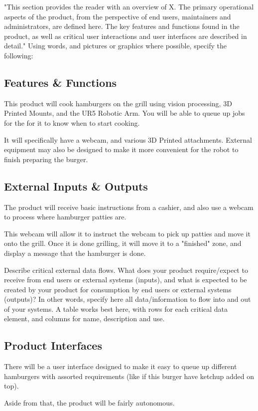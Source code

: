 "This section provides the reader with an overview of X. The primary operational aspects of the product, from the perspective of end users, maintainers and administrators, are defined here. The key features and functions found in the product, as well as critical user interactions and user interfaces are described in detail." Using words, and pictures or graphics where possible, specify the following:

\subsection{Features \& Functions}

This product will cook hamburgers on the grill using vision processing, 3D Printed Mounts, and the UR5 Robotic Arm. You will be able to queue up jobs for the \productname{} for it to know when to start cooking. 

It will specifically have a webcam, and various 3D Printed attachments. External equipment may also be designed to make it more convenient for the robot to finish preparing the burger. 

\subsection{External Inputs \& Outputs}
The product will receive basic instructions from a cashier, and also use a webcam to process where hamburger patties are. 

This webcam will allow it to instruct the webcam to pick up patties and move it onto the grill. Once it is done grilling, it will move it to a "finished" zone, and display a message that the hamburger is done. 

Describe critical external data flows. What does your product require/expect to receive from end users or external systems (inputs), and what is expected to be created by your product for consumption by end users or external systems (outputs)? In other words, specify here all data/information to flow into and out of your systems. A table works best here, with rows for each critical data element, and columns for name, description and use.

\subsection{Product Interfaces}
There will be a user interface designed to make it easy to queue up different hamburgers with assorted requirements (like if this burger have ketchup added on top). 

Aside from that, the product will be fairly autonomous. 